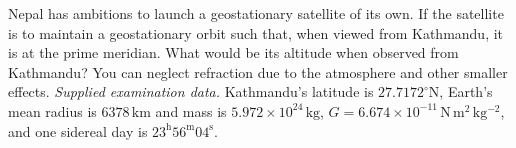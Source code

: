Nepal has ambitions to launch a geostationary satellite of its own. If the satellite is to maintain a geostationary orbit such that, when viewed from Kathmandu, it is at the prime meridian. What would be its altitude when observed from Kathmandu? You can neglect refraction due to the atmosphere and other smaller effects.
\textit{Supplied examination data.} Kathmandu's latitude is $27.7172^\circ\mathrm{N}$, Earth's mean radius is $6378\,\mathrm{km}$ and mass is $5.972\times10^{24}\,\mathrm{kg}$, $G=6.674\times10^{-11}\,\mathrm{N\,m^2\,kg^{-2}}$, and one sidereal day is $23^{\mathrm h}56^{\mathrm m}04^{\mathrm s}$.
